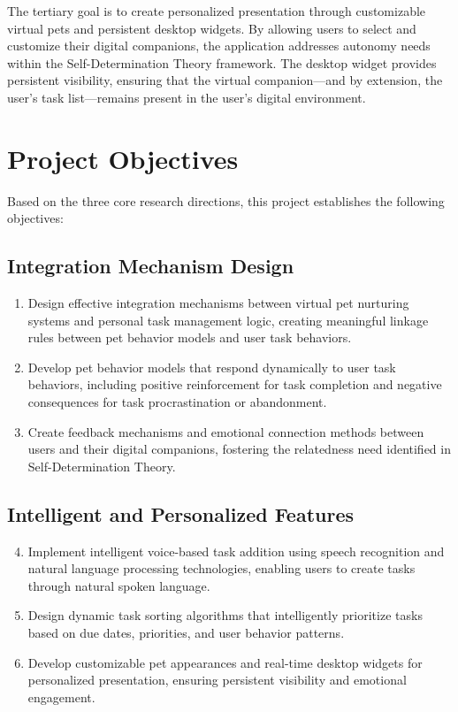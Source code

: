 The tertiary goal is to create personalized presentation through customizable virtual pets and persistent desktop widgets. By allowing users to select and customize their digital companions, the application addresses autonomy needs within the Self-Determination Theory framework. The desktop widget provides persistent visibility, ensuring that the virtual companion---and by extension, the user's task list---remains present in the user's digital environment.

\section{Project Objectives}
\label{sec:objectives}

Based on the three core research directions, this project establishes the following objectives:

\subsection{Integration Mechanism Design}

\begin{enumerate}
    \item Design effective integration mechanisms between virtual pet nurturing systems and personal task management logic, creating meaningful linkage rules between pet behavior models and user task behaviors.
    
    \item Develop pet behavior models that respond dynamically to user task behaviors, including positive reinforcement for task completion and negative consequences for task procrastination or abandonment.
    
    \item Create feedback mechanisms and emotional connection methods between users and their digital companions, fostering the relatedness need identified in Self-Determination Theory.
\end{enumerate}

\subsection{Intelligent and Personalized Features}

\begin{enumerate}
    \setcounter{enumi}{3}
    \item Implement intelligent voice-based task addition using speech recognition and natural language processing technologies, enabling users to create tasks through natural spoken language.
    
    \item Design dynamic task sorting algorithms that intelligently prioritize tasks based on due dates, priorities, and user behavior patterns.
    
    \item Develop customizable pet appearances and real-time desktop widgets for personalized presentation, ensuring persistent visibility and emotional engagement.
\end{enumerate}

